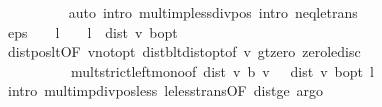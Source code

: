 \begin{isabellebody}
\ \ \ \ \ \ \ \ \isamarkupfalse%
\ {\isacharparenleft}{\kern0pt}auto\ intro{\isacharbang}{\kern0pt}{\isacharcolon}{\kern0pt}\ mult{\isacharunderscore}{\kern0pt}imp{\isacharunderscore}{\kern0pt}less{\isacharunderscore}{\kern0pt}div{\isacharunderscore}{\kern0pt}pos\ intro{\isacharcolon}{\kern0pt}\ neq{\isacharunderscore}{\kern0pt}le{\isacharunderscore}{\kern0pt}trans{\isacharparenright}{\kern0pt}\isanewline
\ \ \ \ \ \ \isamarkupfalse%
\ {\isachardoublequoteopen}eps\ {\isacharasterisk}{\kern0pt}\ {\isacharparenleft}{\kern0pt}{}\ {\isacharminus}{\kern0pt}\ l{\isacharparenright}{\kern0pt}\ {\isacharslash}{\kern0pt}\ {\isacharparenleft}{\kern0pt}{}\ {\isacharasterisk}{\kern0pt}\ l{\isacharparenright}{\kern0pt}\ {\isacharless}{\kern0pt}\ dist\ v\ {\isasymnu}\isactrlsub b{\isacharunderscore}{\kern0pt}opt{\isachardoublequoteclose}\ \isanewline
\ \ \ \ \ \ \ \ \isamarkupfalse%
\ dist{\isacharunderscore}{\kern0pt}pos{\isacharunderscore}{\kern0pt}lt{\isacharbrackleft}{\kern0pt}OF\ v{\isacharunderscore}{\kern0pt}not{\isacharunderscore}{\kern0pt}opt{\isacharbrackright}{\kern0pt}\ dist{\isacharunderscore}{\kern0pt}{\isasymL}\isactrlsub b{\isacharunderscore}{\kern0pt}lt{\isacharunderscore}{\kern0pt}dist{\isacharunderscore}{\kern0pt}opt{\isacharbrackleft}{\kern0pt}of\ v{\isacharbrackright}{\kern0pt}\ gt{\isacharunderscore}{\kern0pt}zero\ zero{\isacharunderscore}{\kern0pt}le{\isacharunderscore}{\kern0pt}disc\ \isanewline
\ \ \ \ \ \ \ \ \ \ mult{\isacharunderscore}{\kern0pt}strict{\isacharunderscore}{\kern0pt}left{\isacharunderscore}{\kern0pt}mono{\isacharbrackleft}{\kern0pt}of\ {\isachardoublequoteopen}dist\ v\ {\isacharparenleft}{\kern0pt}{\isasymL}\isactrlsub b\ v{\isacharparenright}{\kern0pt}{\isachardoublequoteclose}\ {\isachardoublequoteopen}{\isacharparenleft}{\kern0pt}{}\ {\isacharasterisk}{\kern0pt}\ dist\ v\ {\isasymnu}\isactrlsub b{\isacharunderscore}{\kern0pt}opt{\isacharparenright}{\kern0pt}{\isachardoublequoteclose}\ l{\isacharbrackright}{\kern0pt}\isanewline
\ \ \ \ \ \ \ \ \isamarkupfalse%
\ {\isacharparenleft}{\kern0pt}intro\ mult{\isacharunderscore}{\kern0pt}imp{\isacharunderscore}{\kern0pt}div{\isacharunderscore}{\kern0pt}pos{\isacharunderscore}{\kern0pt}less\ le{\isacharunderscore}{\kern0pt}less{\isacharunderscore}{\kern0pt}trans{\isacharbrackleft}{\kern0pt}OF\ dist{\isacharunderscore}{\kern0pt}ge{\isacharbrackright}{\kern0pt}{\isacharcomma}{\kern0pt}\ argo{\isacharplus}{\kern0pt}{\isacharparenright}{\kern0pt}\isanewline
\ \ \ \ \isamarkupfalse%

\end{isabellebody}
